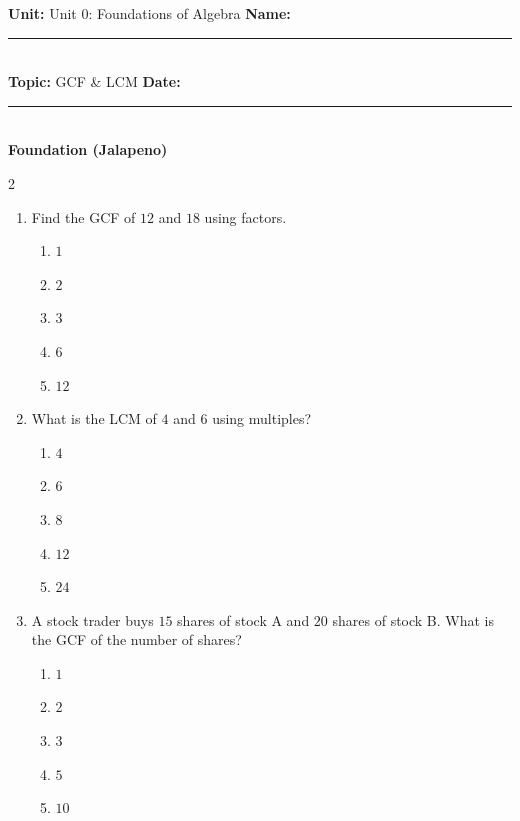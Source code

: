 \documentclass[10pt]{article}
\begin{document}
\enlargethispage{2.5cm}

\begin{tcolorbox}[colback=mainblue!5, colframe=mainblue, sharp corners, boxrule=0.5pt]
    \small \textbf{Unit:} Unit 0: Foundations of Algebra \hfill \textbf{Name:} \rule{3cm}{0.4pt} \\
    \small \textbf{Topic:} GCF & LCM \hfill \textbf{Date:} \rule{2cm}{0.4pt} \\
    \centering \textbf{\large Foundation (Jalapeno)}
\end{tcolorbox}

\vspace{0.2cm}

\begin{multicols}{2}
\begin{enumerate}[label=\textbf{Q\arabic*.}, leftmargin=*, itemsep=6pt, parsep=0pt]

  \item \small Find the GCF of $12$ and $18$ using factors.
  \begin{enumerate}[label=(\Alph*), leftmargin=0.6cm, nosep, itemsep=2pt]
    \item $1$
    \item $2$
    \item $3$
    \item $6$
    \item $12$
  \end{enumerate}

  \item \small What is the LCM of $4$ and $6$ using multiples?
  \begin{enumerate}[label=(\Alph*), leftmargin=0.6cm, nosep, itemsep=2pt]
    \item $4$
    \item $6$
    \item $8$
    \item $12$
    \item $24$
  \end{enumerate}

  \item \small A stock trader buys $15$ shares of stock A and $20$ shares of stock B. What is the GCF of the number of shares?
  \begin{enumerate}[label=(\Alph*), leftmargin=0.6cm, nosep, itemsep=2pt]
    \item $1$
    \item $2$
    \item $3$
    \item $5$
    \item $10$
  \end{enumerate}


\end{enumerate}
\end{multicols}
\end{document}
